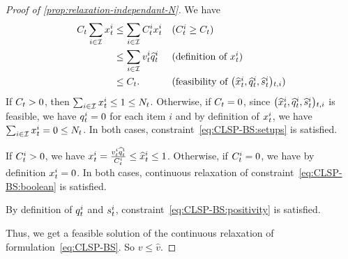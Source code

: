 \begin{proof}[Proof of \cref{prop:relaxation-independant-N}]
We have
\begin{subequations}
\begin{align}
\capacity_t\sum_{i\in\REF}\setup_t^i
&\le
\sum_{i\in\REF}\capacity_t^i\setup_t^i
&& \mbox{($\capacity_t^i\ge\capacity_t$)}
\\
&\le
\sum_{i\in\REF}\rate_t^i\widehat{\quantity}_t^i
&& \mbox{(definition of $\setup_t^i$)}
\\
&\le
\capacity_t.
&& \mbox{(feasibility of $\bracket{\widehat{\setup}_t^i, \widehat{\quantity}_t^i, \widehat{\inventory}_t^i}_{t,i}$)}
\end{align}
\end{subequations}
If $C_t>0$, then $\sum_{i\in\mathcal{I}}x_t^i\le 1\le N_t$.
Otherwise, if $C_t=0$, since $\bracket{\widehat{\setup}_t^i, \widehat{\quantity}_t^i, \widehat{\inventory}_t^i}_{t,i}$ is feasible, we have $q_t^i=0$ for each item $i$ and by definition of $x_t^i$, we have $\sum_{i\in\mathcal{I}}x_t^i=0\le N_t$.
In both cases, constraint~\eqref{eq:CLSP-BS:setups} is satisfied.

If $C_t^i>0$, we have $x_t^i=\frac{v_t^i\widehat{q}_t^i}{C_t^i}\le\widehat{x}_t^i\le 1$.
Otherwise, if $C_t^i=0$, we have by definition $x_t^i=0$.
In both cases, continuous relaxation of constraint~\eqref{eq:CLSP-BS:boolean} is satisfied.

By definition of $q_t^i$ and $s_t^i$, constraint~\eqref{eq:CLSP-BS:positivity} is satisfied.

Thus, we get a feasible solution of the continuous relaxation of formulation~\eqref{eq:CLSP-BS}.
So $v \le \widehat{v}$.
\end{proof}







